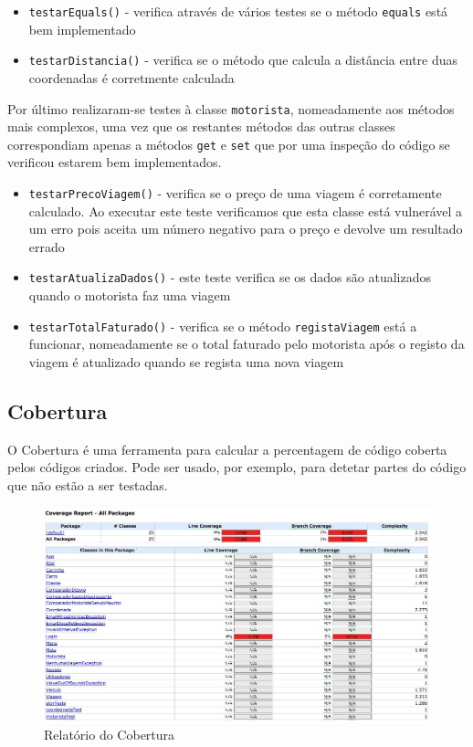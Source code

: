 \begin{itemize}
    \item \texttt{testarEquals()} - verifica através de vários testes se o método \texttt{equals} está bem implementado
    
    \item \texttt{testarDistancia()} - verifica se o método que calcula a distância entre duas coordenadas é corretmente calculada
\end{itemize}

Por último realizaram-se testes à classe \texttt{motorista}, nomeadamente aos métodos mais complexos, uma vez que os restantes métodos das outras classes correspondiam apenas a métodos \texttt{get} e \texttt{set} que por uma inspeção do código se verificou estarem bem implementados. 

\begin{itemize}
    \item \texttt{testarPrecoViagem()} - verifica se o preço de uma viagem é corretamente calculado. Ao executar este teste verificamos que esta classe está vulnerável a um erro pois aceita um número negativo para o preço e devolve um resultado errado

    \item \texttt{testarAtualizaDados()} - este teste verifica se os dados são atualizados quando o motorista faz uma viagem
    
    \item \texttt{testarTotalFaturado()} - verifica se o método \texttt{registaViagem} está a funcionar, nomeadamente se o total faturado pelo motorista após o registo da viagem é atualizado quando se regista uma nova viagem
\end{itemize}


\subsection{Cobertura}

O Cobertura é  uma ferramenta para calcular a percentagem de código coberta pelos códigos criados. Pode ser usado, por exemplo, para detetar partes do código que não estão a ser testadas.

\begin{figure}[H]
    \centering
    \includegraphics[scale=0.5]{tex/img/cobertura.jpg}
    \caption{Relatório do Cobertura}
    \label{fig:cobertura}
\end{figure}


